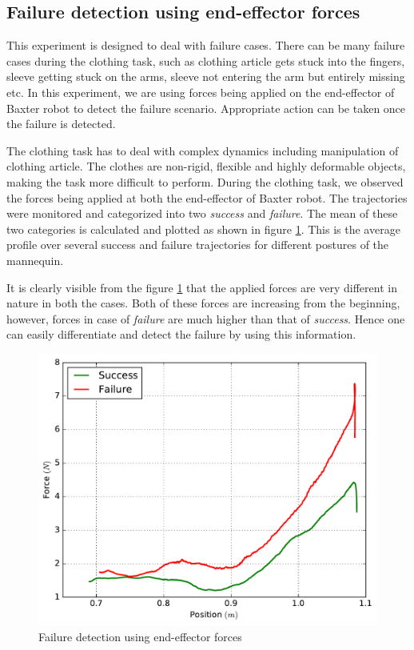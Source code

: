 \documentclass[sigconf]{acmart}
\begin{document}
\subsection{Failure detection using end-effector forces}
This experiment is designed to deal with failure cases. There can be many failure cases during the clothing task, such as clothing article gets stuck into the fingers, sleeve getting stuck on the arms, sleeve not entering the arm but entirely missing etc. In this experiment, we are using forces being applied on the end-effector of Baxter robot to detect the failure scenario. Appropriate action can be taken once the failure is detected.

The clothing task has to deal with complex dynamics including manipulation of clothing article. The clothes are non-rigid, flexible and highly deformable objects, making the task more difficult to perform. During the clothing task, we observed the forces being applied at both the end-effector of Baxter robot. The trajectories were monitored and categorized into two \textit{success} and \textit{failure}. The mean of these two categories is calculated and plotted as shown in figure \ref{fig:position_force}. This is the average profile over several success and failure trajectories for different postures of the mannequin.

It is clearly visible from the figure \ref{fig:position_force} that the applied forces are very different in nature in both the cases. Both of these forces are increasing from the beginning, however, forces in case of \textit{failure} are much higher than that of \textit{success}. Hence one can easily differentiate and detect the failure by using this information.

\begin{figure}
	\includegraphics[width=\linewidth]{position_force}
	\caption{Failure detection using end-effector forces}
	\label{fig:position_force}
\end{figure}
\end{document}
